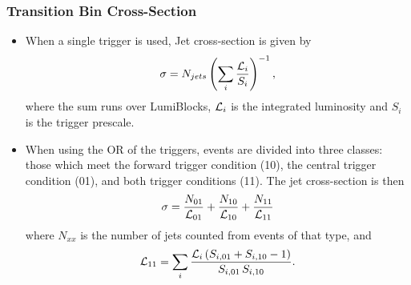 \documentclass[10pt]{beamer}
\begin{document}
\begin{frame}\frametitle{Transition Bin Cross-Section}
\begin{itemize}
\item When a single trigger is used, Jet cross-section is given by
\begin{equation*}
\sigma = N_{jets}\left(\sum_i\frac{{\cal L}_i}{S_i}\right)^{-1},
\end{equation*}
where the sum runs over LumiBlocks, ${\cal L}_i$ is the integrated luminosity and $S_i$ is the trigger prescale.

\item When using the OR of the triggers, events are divided into three classes: those which meet the forward trigger condition (10), the central trigger condition (01), and both trigger conditions (11). The jet cross-section is then
\begin{equation}
\sigma =  \frac{N_\mathrm{01}}{{\cal L}_\mathrm{01}} + \frac{N_\mathrm{10}}{{\cal L}_\mathrm{10}} +\frac{N_\mathrm{11}}{{\cal L}_\mathrm{11}}
\end{equation}
where $N_{xx}$ is the number of jets counted from events of that type, and
\begin{equation*}
{\cal L}_\mathrm{11} = \sum_i\frac{{\cal L}_i \left(S_{i\mathrm{,01}} + S_{i\mathrm{,10}} - 1\right) }{ S_{i\mathrm{,01}} \, S_{i\mathrm{,10}}} .
\end{equation*}
\end{itemize}
\end{frame}
\end{document}
